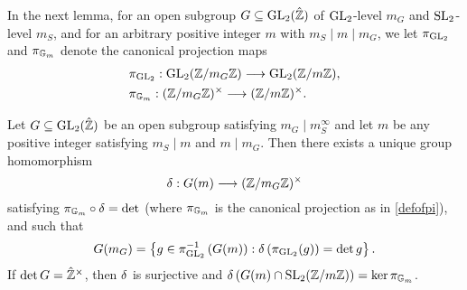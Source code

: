 In the next lemma, for an open subgroup $G \subseteq \operatorname{GL}_2(\hat{\mathbb{Z}})$ of $\operatorname{GL}_2$-level $m_G$ and $\operatorname{SL}_2$-level $m_S$, and for an arbitrary positive integer $m$ with $m_S \mid m \mid m_G$, we let $\pi_{\operatorname{GL}_2}$ and $\pi_{\mathbb{G}_m}$ denote the canonical projection maps
\begin{equation} \label{defofpi}
\begin{split}
&\pi_{\operatorname{GL}_2} :  \operatorname{GL}_2(\mathbb{Z}/m_G\mathbb{Z}) \longrightarrow \operatorname{GL}_2(\mathbb{Z}/m\mathbb{Z}), \\
&\pi_{\mathbb{G}_m} : (\mathbb{Z}/m_G\mathbb{Z})^\times \longrightarrow (\mathbb{Z}/m\mathbb{Z})^\times.
\end{split}
\end{equation}
\begin{lemma} \label{verticalSL2liftlemma}
Let $G \subseteq \operatorname{GL}_2(\hat{\mathbb{Z}})$ be an open subgroup satisfying $m_G \mid m_S^\infty$ and let $m$ be any positive integer satisfying $m_S \mid m$ and $m \mid m_G$.  Then there exists a unique group homomorphism
\[
\delta : G(m) \longrightarrow (\mathbb{Z}/m_G\mathbb{Z})^\times
\]
satisfying $\pi_{\mathbb{G}_m} \circ \delta = \det$ (where $\pi_{\mathbb{G}_m}$ is the canonical projection as in \eqref{defofpi}), and such that
\[
G(m_G) = \left\{ g \in \pi_{\operatorname{GL}_2}^{-1}\left( G(m) \right) : \delta \left( \pi_{\operatorname{GL}_2}(g) \right) = \det g \right\}.
\]
If $\det G = \hat{\mathbb{Z}}^\times$, then $\delta$ is surjective and $\delta\left( G(m) \cap \operatorname{SL}_2(\mathbb{Z}/m\mathbb{Z}) \right) = \ker \pi_{\mathbb{G}_m}$.
\end{lemma}

